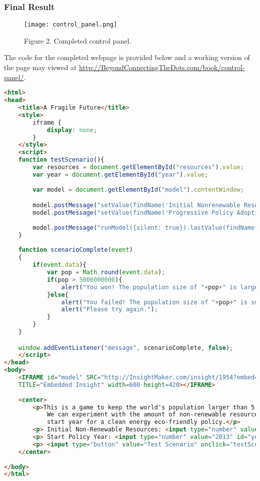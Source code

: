 \documentclass[]{memoir}
\let\Oldincludegraphics\includegraphics
\renewcommand{\includegraphics}[1]{\Oldincludegraphics[max size={\textwidth}{\textheight}]{#1}}
\begin{document}
\subsubsection{Final Result}

\begin{figure}[htbp]
\centering
\texttt{[image: control\_panel.png]}
\caption{Figure 2. Completed control panel.}
\end{figure}

The code for the completed webpage is provided below and a working
version of the page may viewed at
\url{http://BeyondConnectingTheDots.com/book/control-panel/}.

\begin{lstlisting}[language=HTML]
<html>
<head>
    <title>A Fragile Future</title>
    <style>
        iframe {
            display: none;
        }
    </style>
    <script>
    function testScenario(){
        var resources = document.getElementById("resources").value;
        var year = document.getElementById("year").value;
        
        var model = document.getElementById("model").contentWindow;

        model.postMessage("setValue(findName('Initial Nonrenewable Resources'), '"+(resources/100)*1000000000000+"')", "*");
        model.postMessage("setValue(findName('Progressive Policy Adoption'), '"+year+"')", "*");
        
        model.postMessage("runModel({silent: true}).lastValue(findName('Population'))", "*");
    }
    
    function scenarioComplete(event)
    {
        if(event.data){
            var pop = Math.round(event.data);
            if(pop > 5000000000){
                alert("You won! The population size of "+pop+" is larger than 5 Billion!");
            }else{
                alert("You failed! The population size of "+pop+" is smaller than 5 Billion!");
                alert("Please try again.");
            }
        }
    }

    window.addEventListener("message", scenarioComplete, false);
    </script>
</head>
<body>
    <IFRAME id="model" SRC="http://InsightMaker.com/insight/1954?embed=1&topBar=1&sideBar=1&zoom=1"
    TITLE="Embedded Insight" width=600 height=420></IFRAME>  
    
    <center>
        <p>This is a game to keep the world's population larger than 5 billion in the year 2100.
            We can experiment with the amount of non-renewable resources in the world and the
            start year for a clean energy eco-friendly policy.</p>
        <p> Initial Non-Renewable Resources: <input type="number" value="100" id="resources" /> % </p>
        <p> Start Policy Year: <input type="number" value="2013" id="year" /> </p>
        <p> <input type="button" value="Test Scenario" onclick="testScenario()" /> </p>
    </center>
    
</body>
</html>
\end{lstlisting}
\end{document}
